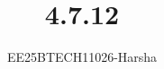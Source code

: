 \documentclass[journal]{IEEEtran}
\begin{document}

\vspace{3cm}

\title{4.7.12}
\author{EE25BTECH11026-Harsha}
 \maketitle
{\let\newpage\relax\maketitle}

\renewcommand{\thefigure}{\theenumi}
\renewcommand{\thetable}{\theenumi}
\setlength{\intextsep}{10pt} %


\renewcommand{\thetable}{\theenumi}
\end{document}

